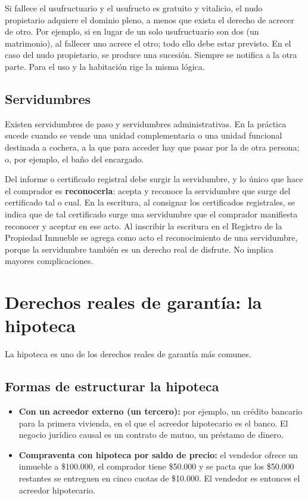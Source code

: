 \documentclass[12pt,oneside]{book}
\begin{document}
Si fallece el usufructuario y el usufructo es gratuito y vitalicio, el nudo propietario adquiere el dominio pleno, a menos que exista el derecho de acrecer de otro. Por ejemplo, si en lugar de un solo usufructuario son dos (un matrimonio), al fallecer uno acrece el otro; todo ello debe estar previsto. En el caso del nudo propietario, se produce una sucesión. Siempre se notifica a la otra parte. Para el uso y la habitación rige la misma lógica.

\subsection{Servidumbres}

Existen servidumbres de paso y servidumbres administrativas. En la práctica sucede cuando se vende una unidad complementaria o una unidad funcional destinada a cochera, a la que para acceder hay que pasar por la de otra persona; o, por ejemplo, el baño del encargado.

Del informe o certificado registral debe surgir la servidumbre, y lo único que hace el comprador es \textbf{reconocerla}: acepta y reconoce la servidumbre que surge del certificado tal o cual. En la escritura, al consignar los certificados registrales, se indica que de tal certificado surge una servidumbre que el comprador manifiesta reconocer y aceptar en ese acto. Al inscribir la escritura en el Registro de la Propiedad Inmueble se agrega como acto el reconocimiento de una servidumbre, porque la servidumbre también es un derecho real de disfrute. No implica mayores complicaciones.

\section{Derechos reales de garantía: la hipoteca}

La hipoteca es uno de los derechos reales de garantía más comunes.

\subsection{Formas de estructurar la hipoteca}

\begin{itemize}
\item \textbf{Con un acreedor externo (un tercero):} por ejemplo, un crédito bancario para la primera vivienda, en el que el acreedor hipotecario es el banco. El negocio jurídico causal es un contrato de mutuo, un préstamo de dinero.
\item \textbf{Compraventa con hipoteca por saldo de precio:} el vendedor ofrece un inmueble a \$100.000, el comprador tiene \$50.000 y se pacta que los \$50.000 restantes se entreguen en cinco cuotas de \$10.000. El vendedor es entonces el acreedor hipotecario.
\end{itemize}
\end{document}
